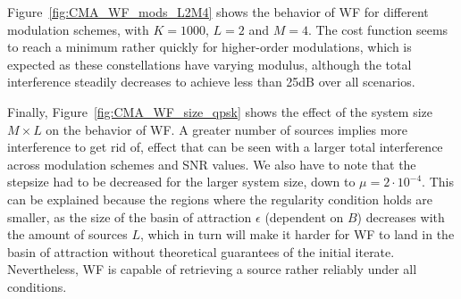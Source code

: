 Figure~\ref{fig:CMA_WF_mods_L2M4} shows the behavior of WF for different modulation schemes, with $K=1000$, $L=2$ and $M=4$. The cost function seems to reach a minimum rather quickly for higher-order modulations, which is expected as these constellations have varying modulus, although the total interference steadily decreases to achieve less than 25dB over all scenarios.

Finally, Figure~\ref{fig:CMA_WF_size_qpsk} shows the effect of the system size $M\times L$ on the behavior of WF. A greater number of sources implies more interference to get rid of, effect that can be seen with a larger total interference across modulation schemes and SNR values. We also have to note that the stepsize had to be decreased for the larger system size, down to $\mu=2\cdot 10^{-4}$. This can be explained because the regions where the regularity condition holds are smaller, as the size of the basin of attraction $\epsilon$ (dependent on $B$) decreases with the amount of sources $L$, which in turn will make it harder for WF to land in the basin of attraction without theoretical guarantees of the initial iterate. Nevertheless, WF is capable of retrieving a source rather reliably under all conditions.

